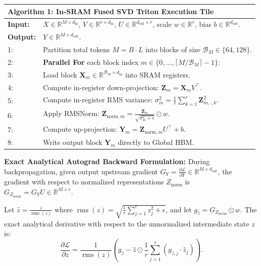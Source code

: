 \begin{table}[h]
\centering
\small
\begin{tabularx}{\columnwidth}{lX}
\toprule
\multicolumn{2}{l}{\textbf{Algorithm 1: In-SRAM Fused SVD Triton Execution Tile}} \\
\midrule
\textbf{Input:} & $X \in \mathbb{R}^{M \times d_{\text{in}}}$, $V \in \mathbb{R}^{r \times d_{\text{in}}}$, $U \in \mathbb{R}^{d_{\text{out}} \times r}$, scale $w \in \mathbb{R}^r$, bias $b \in \mathbb{R}^{d_{\text{out}}}$. \\
\textbf{Output:} & $Y \in \mathbb{R}^{M \times d_{\text{out}}}$. \\
\midrule
1: & Partition total tokens $M = B \cdot L$ into blocks of size $\mathcal{B}_M \in \{64, 128\}$. \\
2: & \textbf{Parallel For} each block index $m \in \{0, \dots, \lceil M / \mathcal{B}_M \rceil - 1\}$: \\
3: & \quad Load block $\mathbf{X}_m \in \mathbb{R}^{\mathcal{B}_M \times d_{\text{in}}}$ into SRAM registers. \\
4: & \quad Compute in-register down-projection: $\mathbf{Z}_m = \mathbf{X}_m V^\top$. \\
5: & \quad Compute in-register RMS variance: $\sigma_m^2 = \frac{1}{r} \sum_{k=1}^r \mathbf{Z}_{m, \cdot, k}^2$. \\
6: & \quad Apply RMSNorm: $\mathbf{Z}_{\text{norm}, m} = \frac{\mathbf{Z}_m}{\sqrt{\sigma_m^2 + \epsilon}} \odot w$. \\
7: & \quad Compute up-projection: $\mathbf{Y}_m = \mathbf{Z}_{\text{norm}, m} U^\top + b$. \\
8: & \quad Write output block $\mathbf{Y}_m$ directly to Global HBM. \\
\bottomrule
\end{tabularx}
\end{table}

\textbf{Exact Analytical Autograd Backward Formulation:} During backpropagation, given output upstream gradient $G_Y = \frac{\partial \mathcal{L}}{\partial Y} \in \mathbb{R}^{M \times d_{\text{out}}}$, the gradient with respect to normalized representations $Z_{\text{norm}}$ is $G_{Z_{\text{norm}}} = G_Y U \in \mathbb{R}^{M \times r}$.

Let $\hat{z} = \frac{z}{\operatorname{rms}(z)}$ where $\operatorname{rms}(z) = \sqrt{\frac{1}{r} \sum_{j=1}^r z_j^2 + \epsilon}$, and let $g_{\hat{z}} = G_{Z_{\text{norm}}} \odot w$. The exact analytical derivative with respect to the unnormalized intermediate state $z$ is:
\begin{equation}
\frac{\partial \mathcal{L}}{\partial z} = \frac{1}{\operatorname{rms}(z)} \left( g_{\hat{z}} - \hat{z} \odot \frac{1}{r} \sum_{j=1}^r (g_{\hat{z}, j} \cdot \hat{z}_j) \right).
\end{equation}

